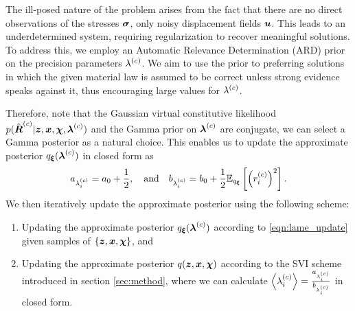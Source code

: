 The ill-posed nature of the problem arises from the fact that there are no direct observations of the stresses $\boldsymbol{\sigma}$, only noisy displacement fields $\boldsymbol{u}$. This leads to an underdetermined system, requiring regularization to recover meaningful solutions. To address this, we employ an Automatic Relevance Determination (ARD) prior on the precision parameters $\lambda^{(c)}$. We aim to use the prior to preferring solutions in which the given material law is assumed to be correct unless strong evidence speaks against it, thus encouraging large values for $\lambda^{(c)}$. 

Therefore, note that the Gaussian virtual constitutive likelihood $p(\hat{\boldsymbol{R}}^{(c)} | \boldsymbol{z}, \boldsymbol{x}, \boldsymbol{\chi}, \boldsymbol{\lambda}^{(c)})$ and the Gamma prior on $\boldsymbol{\lambda}^{(c)}$ are conjugate, we can select a Gamma posterior as a natural choice. This enables us to update the approximate posterior $q_{\boldsymbol{\xi}}(\boldsymbol{\lambda}^{(c)})$ in closed form as
\begin{equation}
    a_{\lambda^{(c)}_i} = a_0 + \frac{1}{2}, \quad \mathrm{and} \quad b_{\lambda^{(c)}_i} = b_0 + \frac{1}{2} \mathbb{E}_{q_{\boldsymbol{\xi}}} \left[ \left( r^{(c)}_i \right)^2 \right]. \label{eqn:lame_update}
\end{equation}
We then iteratively update the approximate posterior using the following scheme:
\begin{enumerate}
    \item Updating the approximate posterior $q_{\boldsymbol{\xi}}(\boldsymbol{\lambda}^{(c)})$ according to \eqref{eqn:lame_update} given samples of $\{ \boldsymbol{z}, \boldsymbol{x}, \boldsymbol{\chi} \}$, and
    \item Updating the approximate posterior $q(\boldsymbol{z}, \boldsymbol{x}, \boldsymbol{\chi})$ according to the SVI scheme introduced in section \ref{sec:method}, where we can calculate $\left< \lambda^{(c)}_i \right> = \frac{a_{\lambda^{(c)}_i}}{b_{\lambda^{(c)}_i}}$ in closed form.
\end{enumerate}

